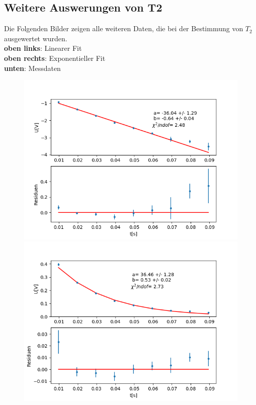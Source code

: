 \documentclass[12pt,a4paper]{article}
\begin{document}
\subsection{Weitere Auswerungen von T2}
Die Folgenden Bilder zeigen alle weiteren Daten, die bei der Bestimmung von $T_2$ ausgewertet wurden.\\
\textbf{oben links}: Linearer Fit\\
\textbf{oben rechts}: Exponentieller Fit\\
\textbf{unten}: Messdaten\\
\begin{figure}[H]
\centering
\includegraphics[scale=0.5]{Bilder/T2Anhang/T2log5.png}
\includegraphics[scale=0.5]{Bilder/T2Anhang/T2exp5.png}

\end{figure}
\end{document}
